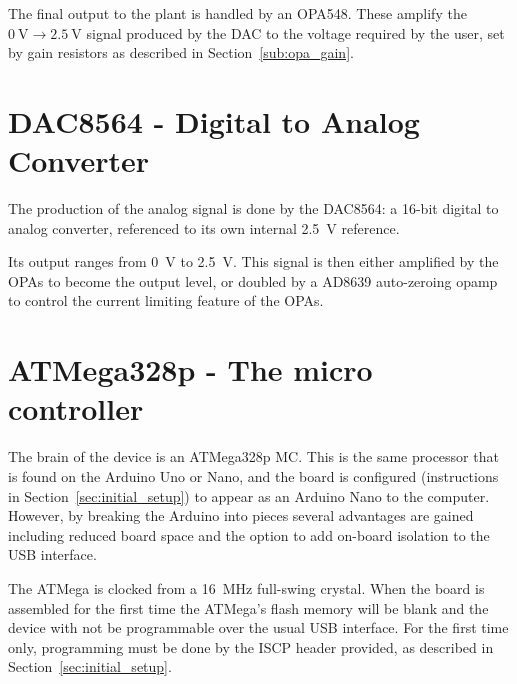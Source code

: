 \documentclass[11pt]{report}
\begin{document}
The final output to the plant is handled by an OPA548. These amplify the $\SI{0}{\volt} \rightarrow \SI{2.5}{\volt}$ signal produced by the DAC to the voltage required by the user, set by gain resistors as described in Section~\ref{sub:opa_gain}.


\section{DAC8564 - Digital to Analog Converter} %
\label{sub:dac8564_digital_to_analog_converter}

The production of the analog signal is done by the DAC8564: a 16-bit digital to analog converter, referenced to its own internal \SI{2.5}{\volt} reference. 

Its output ranges from \SI{0}{\volt} to \SI{2.5}{\volt}. This signal is then either amplified by the OPAs to become the output level, or doubled by a AD8639 auto-zeroing opamp to control the current limiting feature of the OPAs. 


\section{ATMega328p - The micro controller} %
\label{sub:atmega328p_the_micro_controller}

The brain of the device is an ATMega328p MC. This is the same processor that is found on the Arduino Uno or Nano, and the board is configured (instructions in Section~\ref{sec:initial_setup}) to appear as an Arduino Nano to the computer. However, by breaking the Arduino into pieces several advantages are gained including reduced board space and the option to add on-board isolation to the USB interface. 

The ATMega is clocked from a \SI{16}{\MHz} full-swing crystal. When the board is assembled for the first time the ATMega's flash memory will be blank and the device with not be programmable over the usual USB interface. For the first time only, programming must be done by the ISCP header provided, as described in Section~\ref{sec:initial_setup}. 


\end{document}
